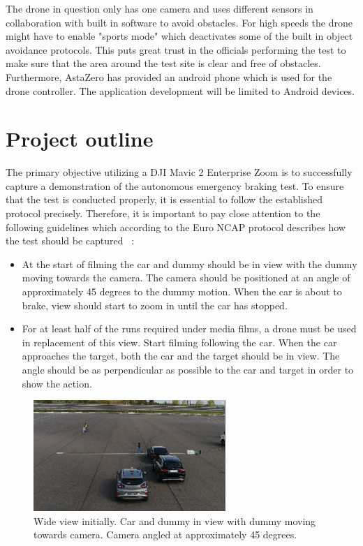 \bigskip
\newline
The drone in question only has one camera and uses different sensors in collaboration with built in software to avoid obstacles. For high speeds the drone might have to enable "sports mode" which deactivates some of the built in object avoidance protocols. This puts great trust in the officials performing the test to make sure that the area around the test site is clear and free of obstacles. 
\\
Furthermore, AstaZero has provided an android phone which is used for the drone controller. The application development will be limited to Android devices.
\section{Project outline}
The primary objective utilizing a DJI Mavic 2 Enterprise Zoom is to successfully capture a demonstration of the autonomous emergency braking test. To ensure that the test is conducted properly, it is essential to follow the established protocol precisely. Therefore, it is important to pay close attention to the following guidelines which according to the Euro NCAP protocol describes how the test should be captured
~\cite{EuroNCAP2021EUROPEANPROTOCOL}:
\begin{itemize}
    \item At the start of filming the car and dummy should be in view with the dummy moving towards the camera. The camera should be positioned at an angle of approximately 45 degrees to the dummy motion. When the car is about to brake, view should start to zoom in until the car has stopped.
    \item For at least half of the runs required under media films, a drone must be used in replacement of this view. Start filming following the car. When the car approaches the target, both the car and the target should be in view. The angle should be as perpendicular as possible to the car and target in order to show the action.
\end{itemize}


\begin{figure}[h!]
\centering
 \includegraphics[width=0.65\textwidth,angle =0]{figure/45_degree_angle_of_abs_test.png}
\caption{Wide view initially.
Car and dummy in view with dummy moving towards camera. Camera angled at approximately 
45 degrees.~\cite{EuroNCAP2021EUROPEANPROTOCOL}} 
\end{figure}

